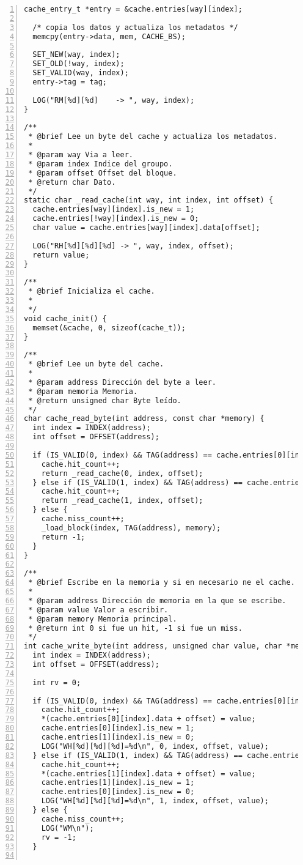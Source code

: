 \documentclass[11pt,a4paper, spanish]{article}
\begin{document}
\begin{lstlisting}[numbers=left, tabsize=2, basicstyle=\fontsize{11}{13}\ttfamily, frame=single, caption={makefile}]
  cache_entry_t *entry = &cache.entries[way][index];

  /* copia los datos y actualiza los metadatos */
  memcpy(entry->data, mem, CACHE_BS);

  SET_NEW(way, index);
  SET_OLD(!way, index);
  SET_VALID(way, index);
  entry->tag = tag;

  LOG("RM[%d][%d]    -> ", way, index);
}

/**
 * @brief Lee un byte del cache y actualiza los metadatos.
 *
 * @param way Via a leer.
 * @param index Indice del groupo.
 * @param offset Offset del bloque.
 * @return char Dato.
 */
static char _read_cache(int way, int index, int offset) {
  cache.entries[way][index].is_new = 1;
  cache.entries[!way][index].is_new = 0;
  char value = cache.entries[way][index].data[offset];

  LOG("RH[%d][%d][%d] -> ", way, index, offset);
  return value;
}

/**
 * @brief Inicializa el cache.
 *
 */
void cache_init() {
  memset(&cache, 0, sizeof(cache_t));
}

/**
 * @brief Lee un byte del cache.
 *
 * @param address Dirección del byte a leer.
 * @param memoria Memoria.
 * @return unsigned char Byte leído.
 */
char cache_read_byte(int address, const char *memory) {
  int index = INDEX(address);
  int offset = OFFSET(address);

  if (IS_VALID(0, index) && TAG(address) == cache.entries[0][index].tag) {
    cache.hit_count++;
    return _read_cache(0, index, offset);
  } else if (IS_VALID(1, index) && TAG(address) == cache.entries[1][index].tag) {
    cache.hit_count++;
    return _read_cache(1, index, offset);
  } else {
    cache.miss_count++;
    _load_block(index, TAG(address), memory);
    return -1;
  }
}

/**
 * @brief Escribe en la memoria y si en necesario ne el cache.
 *
 * @param address Dirección de memoria en la que se escribe.
 * @param value Valor a escribir.
 * @param memory Memoria principal.
 * @return int 0 si fue un hit, -1 si fue un miss.
 */
int cache_write_byte(int address, unsigned char value, char *memory) {
  int index = INDEX(address);
  int offset = OFFSET(address);

  int rv = 0;

  if (IS_VALID(0, index) && TAG(address) == cache.entries[0][index].tag) {
    cache.hit_count++;
    *(cache.entries[0][index].data + offset) = value;
    cache.entries[0][index].is_new = 1;
    cache.entries[1][index].is_new = 0;
    LOG("WH[%d][%d][%d]=%d\n", 0, index, offset, value);
  } else if (IS_VALID(1, index) && TAG(address) == cache.entries[1][index].tag) {
    cache.hit_count++;
    *(cache.entries[1][index].data + offset) = value;
    cache.entries[1][index].is_new = 1;
    cache.entries[0][index].is_new = 0;
    LOG("WH[%d][%d][%d]=%d\n", 1, index, offset, value);
  } else {
    cache.miss_count++;
    LOG("WM\n");
    rv = -1;
  }


\end{lstlisting}
\end{document}
